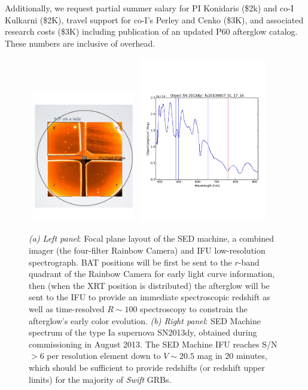 \documentclass[letterpaper,11pt]{article}
\begin{document}
Additionally, we request partial summer salary for PI Konidaris (\$2k) and
co-I Kulkarni (\$2K), travel support for co-I's Perley and Cenko
(\$3K), and associated research costs (\$3K) including publication of an
updated P60 afterglow catalog.  These numbers are inclusive of overhead. 

\begin{figure}[ht!]
\begin{center}
\hbox{
 \includegraphics[width=0.4\textwidth]{SEDM.pdf}
 \hspace{0.5cm}
 \includegraphics[width=0.5\textwidth]{SN2013dy.pdf}
 }
\end{center}
\caption{\footnotesize
{{\it (a) Left panel}: Focal plane layout of the SED machine, a combined imager 
(the four-filter Rainbow Camera) and IFU low-resolution spectrograph.  BAT positions 
will be first be sent to the $r$-band quadrant of the Rainbow Camera for early 
light curve information, then (when the XRT position is distributed) the afterglow 
will be sent to the IFU to provide an immediate spectroscopic redshift as well as 
time-resolved $R\sim100$ spectroscopy to constrain the afterglow's early color 
evolution. {\it (b) Right panel}: SED Machine spectrum of the type Ia supernova
SN2013dy, obtained during commissioning in August 2013. The SED Machine IFU
reaches S/N$>$6 per resolution element down to $V \sim 20.5$ mag in 20 minutes,
which should be sufficient to provide redshifts (or redshift upper limits) for
the majority of \textit{Swift} GRBs.}}
\label{fig2}
\end{figure}
\end{document}
